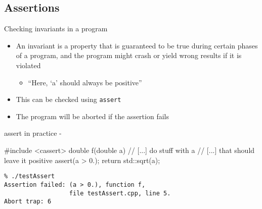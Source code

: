 \subsection[assert]{Assertions}

\begin{frame}[fragile]
  \begin{block}{Checking invariants in a program}
    \begin{itemize}
      \item An invariant is a property that is guaranteed to be true during certain phases of a program, and the program might crash or yield wrong results if it is violated
      \begin{itemize}
        \item ``Here, `a' should always be positive''
      \end{itemize}
      \item This can be checked using \texttt{assert}
      \item The program will be aborted if the assertion fails
    \end{itemize}
  \end{block}
  \begin{exampleblock}{assert in practice - }
    \begin{overprint}
    \begin{cppcode*}{}
      #include <cassert>
      double f(double a) {
        // [...] do stuff with a
        // [...] that should leave it positive
        assert(a > 0.);
        return std::sqrt(a);
      }
    \end{cppcode*}
    \begin{Verbatim}
% ./testAssert
Assertion failed: (a > 0.), function f,
                  file testAssert.cpp, line 5.
Abort trap: 6
    \end{Verbatim}
    \end{overprint}
  \end{exampleblock}
\end{frame}

